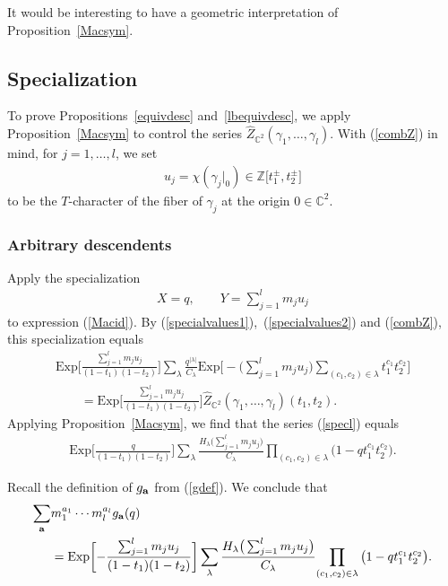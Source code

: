 \documentclass[10pt,a4paper]{amsart}
\numberwithin{equation}{section}
\newcommand{\Exp}{\mathrm{Exp}}
\def\C{\mathbb C}
\def\Z{\mathbb Z}
\begin{document}
It would be interesting to have a geometric interpretation of Proposition~\ref{Macsym}.

\subsection{Specialization}
To prove Propositions~\ref{equivdesc} and~\ref{lbequivdesc}, we apply Proposition~\ref{Macsym} to control the series $\hat{Z}_{\C^2}(\gamma_1,\dots,\gamma_l)$. With (\ref{combZ}) in mind, for $j=1,\dots,l$, we set
\begin{gather*}
u_j=\chi(\gamma_j|_0)\in \Z\big[t_1^{\pm},t_2^{\pm}\big]
\end{gather*}
to be the $T$-character of the fiber of $\gamma_j$ at the origin $0\in\C^2$.

\subsubsection{Arbitrary descendents}\label{ardescpf}
Apply the specialization
\begin{gather*}
X=q, \qquad Y=\sum_{j=1}^{l} m_ju_j
\end{gather*}
to expression (\ref{Macid}).
By (\ref{specialvalues1}),~(\ref{specialvalues2}) and (\ref{combZ}), this specialization equals
\begin{gather}
\Exp\bigg[\frac{\sum_{j=1}^{l} m_ju_j}{(1-t_1)(1-t_2)}\bigg] \sum_{\lambda} \frac{q^{|\lambda|}}{C_{\lambda}}\Exp\Biggl[{-}\bigg(\sum_{j=1}^{l} m_ju_j\bigg) \sum_{(c_1,c_2)\in \lambda}t_1^{c_1}t_2^{c_2} \Biggr]\nonumber
\\ \qquad
{}=\Exp\bigg[\frac{\sum_{j=1}^{l} m_ju_j}{(1-t_1)(1-t_2)}\bigg] \hat{Z}_{\C^2}(\gamma_1,\dots,\gamma_l)(t_1,t_2).\label{specl}
\end{gather}
Applying Proposition~\ref{Macsym}, we find that the series (\ref{specl}) equals
\begin{align*}
\Exp\bigg[\frac{q}{(1-t_1)(1-t_2)}\bigg] \sum_{\lambda} \frac{H_{\lambda} \big(\sum_{j=1}^{l} m_ju_j\big)}{C_{\lambda}} { \prod_{(c_1,c_2)\in \lambda} \big(1-qt_1^{c_1}t_2^{c_2}\big)}.
\end{align*}

Recall the definition of $g_{\bf{a}}$ from (\ref{gdef}). We conclude that
\begin{align}\label{rpart} \nonumber
\sum_{\bf{a}} &m_1^{a_1}\cdots m_l^{a_l} g_{\bf{a}}(q)\\&= \Exp\bigg[{-}\frac{\sum_{j=1}^{l} m_ju_j}{(1-t_1)(1-t_2)}\bigg] \sum_{\lambda} \frac{H_{\lambda} \big(\sum_{j=1}^{l} m_ju_j\big)}{C_{\lambda}} { \prod_{(c_1,c_2)\in \lambda} \big(1-qt_1^{c_1}t_2^{c_2}\big)}.
\end{align}
\end{document}
